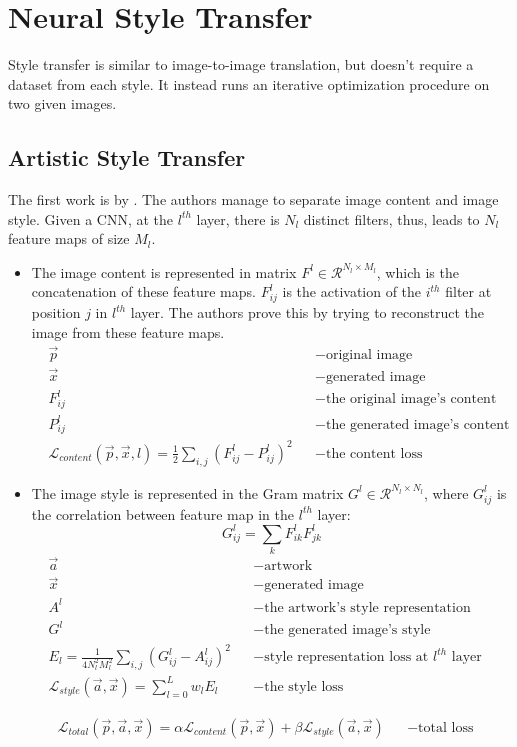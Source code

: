 \section{Neural Style Transfer}
Style transfer is similar to image-to-image translation, but doesn't require a dataset from each style. It instead runs an iterative optimization procedure on two given images.

\subsection{Artistic Style Transfer}
The first work is by . The authors manage to separate image content and image style. Given a \ac{CNN}, at the $l^{th}$ layer, there is $N_l$ distinct filters, thus, leads to $N_l$ feature maps of size $M_l$.
\begin{itemize}
	\item The image content is represented in matrix $F^l \in \mathcal{R}^{N_l \times M_l}$, which is the concatenation of these feature maps. $F^l_{ij}$ is the activation of the $i^{th}$ filter at position $j$ in $l^{th}$ layer. The authors prove this by trying to reconstruct the image from these feature maps.
	\begin{align}
		&\vec{p} &&-\text{original image}\\
		&\vec{x} &&-\text{generated image}\\
		&F^l_{ij} &&-\text{the original image's content }\\
		&P^l_{ij} &&-\text{the generated image's content}\\
		&\mathcal{L}_{content}(\vec{p}, \vec{x}, l) = \frac{1}{2} \sum_{i,j} \left( F^l_{ij} - P^l_{ij} \right) ^2 &&-\text{the content loss}
	\end{align}
	\item The image style is represented in the Gram matrix $G^l \in \mathcal{R}^{N_l \times N_l}$, where $G_{ij}^l$ is the correlation between feature map in the $l^{th}$ layer:
	\begin{equation}
		G_{ij}^l = \sum_k F_{ik}^l F_{jk}^l
	\end{equation}
	\begin{align}
		&\vec{a} &&-\text{artwork}\\
		&\vec{x} &&-\text{generated image}\\
		&A^l &&-\text{the artwork's style representation}\\
		&G^l &&-\text{the generated image's style representation}\\
		&E_l = \frac{1}{4 N^2_l M^2_l} \sum_{i,j} \left( G_{ij}^l - A_{ij}^l \right)^2 &&-\text{style representation loss at $l^{th}$ layer}	\\
		&\mathcal{L}_{style}(\vec{a}, \vec{x}) = \sum_{l=0}^L w_l E_l &&-\text{the style loss}
	\end{align}
\end{itemize}
\begin{align}
	&\mathcal{L}_{total}(\vec{p}, \vec{a}, \vec{x}) =  \alpha \mathcal{L}_{content}(\vec{p}, \vec{x})+ \beta \mathcal{L}_{style}(\vec{a}, \vec{x}) &&-\text{total loss}
\end{align}

